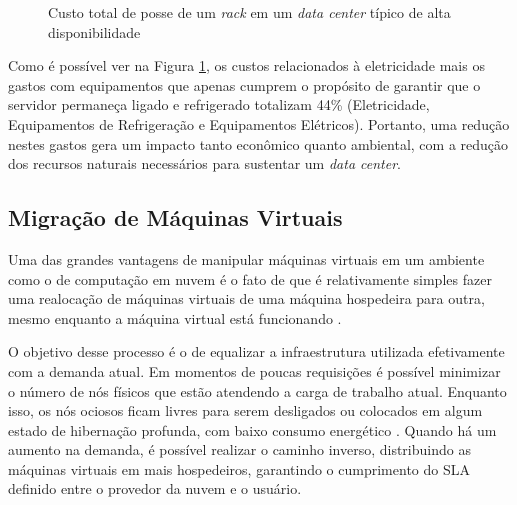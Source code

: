 \begin{figure}
\centering
{}
\caption{Custo total de posse de um \emph{rack} em um \emph{data center} típico 
de alta disponibilidade \cite{rasmussen:tco_data_center}} \label{fig:tco_data_center}
\end{figure}

Como é possível ver na Figura \ref{fig:tco_data_center}, os custos relacionados
à eletricidade mais os gastos com equipamentos que apenas cumprem o propósito de
garantir que o servidor permaneça ligado e refrigerado totalizam 44\% 
(Eletricidade, Equipamentos de Refrigeração e Equipamentos Elétricos). Portanto,
uma redução nestes gastos gera um impacto tanto econômico quanto ambiental, com
a redução dos recursos naturais necessários para sustentar um \emph{data center}.

\subsection{Migração de Máquinas Virtuais}
Uma das grandes vantagens de manipular máquinas virtuais em um ambiente como
o de computação em nuvem é o fato de que é relativamente simples fazer uma 
realocação de máquinas virtuais de uma máquina hospedeira para outra, mesmo
enquanto a máquina virtual está funcionando \cite{vmware:vmotion}
\cite{alkmin:migracao_maquinas_virtuais}.

O objetivo desse processo é o de equalizar a infraestrutura utilizada
efetivamente com a demanda atual. Em momentos de poucas requisições é possível
minimizar o número de nós físicos que estão atendendo a carga de trabalho atual.
Enquanto isso, os nós ociosos ficam livres para serem
desligados ou colocados em algum estado de hibernação profunda, com baixo consumo
energético \cite{beloglazov:energy_efficient_allocation_virtual_machines}.
Quando há um aumento na demanda, é possível realizar o caminho inverso, 
distribuindo as máquinas virtuais em mais hospedeiros, garantindo o cumprimento
do SLA definido entre o provedor da nuvem e o usuário.

